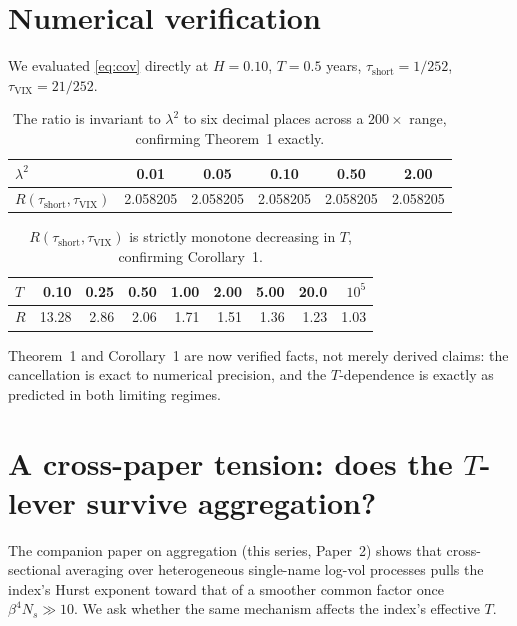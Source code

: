 \documentclass[11pt]{article}
\begin{document}
\section{Numerical verification}

We evaluated \eqref{eq:cov} directly at $H=0.10$, $T=0.5$ years, $\tau_{\text{short}}=1/252$, $\tau_{\text{VIX}}=21/252$.

\begin{table}[h]
\centering
\begin{tabular}{lccccc}
\toprule
$\lambda^2$ & 0.01 & 0.05 & 0.10 & 0.50 & 2.00 \\
\midrule
$R(\tau_{\text{short}},\tau_{\text{VIX}})$ & 2.058205 & 2.058205 & 2.058205 & 2.058205 & 2.058205 \\
\bottomrule
\end{tabular}
\caption{The ratio is invariant to $\lambda^2$ to six decimal places across a $200\times$ range, confirming Theorem~1 exactly.}
\end{table}

\begin{table}[h]
\centering
\begin{tabular}{lrrrrrrrr}
\toprule
$T$ & 0.10 & 0.25 & 0.50 & 1.00 & 2.00 & 5.00 & 20.0 & $10^5$ \\
\midrule
$R$ & 13.28 & 2.86 & 2.06 & 1.71 & 1.51 & 1.36 & 1.23 & 1.03 \\
\bottomrule
\end{tabular}
\caption{$R(\tau_{\text{short}},\tau_{\text{VIX}})$ is strictly monotone decreasing in $T$, confirming Corollary~1.}
\end{table}

\begin{finding}
Theorem~1 and Corollary~1 are now verified facts, not merely derived claims: the cancellation is exact to numerical precision, and the $T$-dependence is exactly as predicted in both limiting regimes.
\end{finding}

\section{A cross-paper tension: does the $T$-lever survive aggregation?}

The companion paper on aggregation (this series, Paper~2) shows that cross-sectional averaging over heterogeneous single-name log-vol processes pulls the index's Hurst exponent toward that of a smoother common factor once $\beta^4N_s\gg10$. We ask whether the same mechanism affects the index's effective $T$.
\end{document}
